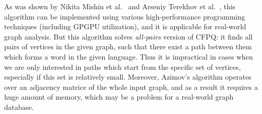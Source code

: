 As was shown by Nikita Mishin et al.~\cite{Mishin:2019:ECP:3327964.3328503} and Arseniy Terekhov et al.~\cite{ 10.1145/3398682.3399163}, this algorithm can be implemented using various high-performance programming techniques (including GPGPU utilization), and it is applicable for real-world graph analysis.
But this algorithm solves \textit{all-pairs} version of CFPQ: it finds all pairs of vertices in the given graph, such that there exist a path between them which forms a word in the given language.
Thus it is impractical in cases when we are only interested in paths which start from the specific set of vertices, especially if this set is relatively small.
Moreover, Azimov's algorithm operates over an adjacency matrice of the whole input graph, and as a result it requires a huge amount of memory, which may be a problem for a real-world graph database.